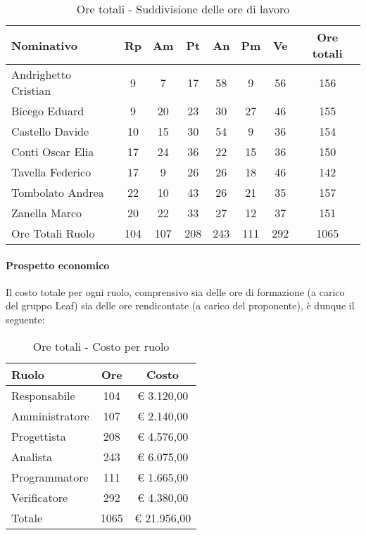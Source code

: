\documentclass[../PianoProgetto.tex]{subfiles}
\begin{document}
					\begin{table}[h]
		\centering
	
		\begin{tabular}{l * {7}{c}}
			\toprule
			Nominativo & Rp & Am & Pt & An & Pm & Ve & Ore totali \\
			\midrule
			Andrighetto Cristian & 9 & 7 & 17 & 58 & 9 & 56 &	156 \\
			\midrule
			Bicego Eduard & 9 & 20 & 23 & 30 & 27 & 46 & 155 \\
			\midrule
			Castello Davide & 10 & 15 & 30 & 54 & 9 & 36 & 154 \\
			\midrule
			Conti Oscar Elia & 17 & 24 & 36 & 22 & 15 & 36 & 150 \\
			\midrule
			Tavella Federico &	17 & 9 & 26 & 26 & 18 & 46 & 142 \\
			\midrule
			Tombolato Andrea & 22 & 10 & 43 & 26 & 21 & 35 & 157 \\
			\midrule
			Zanella Marco & 20 & 22 & 33 & 27 & 12 & 37 & 151 \\
			\midrule			
			Ore Totali Ruolo & 104 & 107 & 208 & 243 & 111 & 292 & 1065 \\
			\bottomrule
			
		\end{tabular}
		
		\caption{Ore totali - Suddivisione delle ore di lavoro}
		\label{tab:totale_ore}
		
	\end{table}
	
	
	\paragraph{Prospetto economico}
					Il costo totale per ogni ruolo, comprensivo sia delle ore di formazione (a carico del gruppo Leaf) sia delle ore rendicontate (a carico del proponente), è dunque il seguente:
					\begin{table}[h]
		\centering
	
		\begin{tabular}{l * {2}{c}}
			\toprule
			Ruolo & Ore & Costo \\
			\midrule
			Responsabile &	104 & \euro{} 3.120,00 \\
			\midrule
			Amministratore & 107 & \euro{} 2.140,00 \\
			\midrule
			Progettista & 208 & \euro{} 4.576,00 \\
			\midrule
			Analista & 243 & \euro{} 6.075,00 \\
			\midrule
			Programmatore & 111 & \euro{} 1.665,00 \\
			\midrule
			Verificatore & 292 & \euro{} 4.380,00 \\
			\midrule		
			Totale & 1065 & \euro{} 21.956,00 \\
			\bottomrule
			
		\end{tabular}
		
		\caption{Ore totali - Costo per ruolo}
		\label{tab:totale_costo}
		
	\end{table}
	
\end{document}
